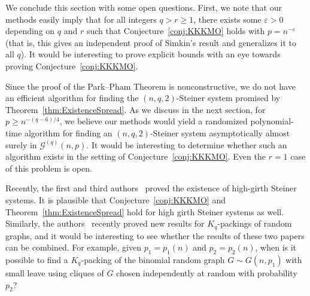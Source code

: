 \documentclass[11pt]{article}
\numberwithin{equation}{section}
\newcounter{i}
\theoremstyle{plain}
\theoremstyle{plain} %
\theoremstyle{definition}
\newcommand{\cG}{\mathcal{G}}
\begin{document}

We conclude this section with some open questions.  First, we note that our methods easily imply that for all integers $q > r\ge 1$, there exists some $\varepsilon > 0$ depending on $q$ and $r$ such that Conjecture~\ref{conj:KKKMO} holds with $p=n^{-\varepsilon}$ (that is, this gives an independent proof of Simkin's result and generalizes it to all $q$). It would be interesting to prove explicit bounds with an eye towards proving Conjecture~\ref{conj:KKKMO}.

Since the proof of the Park--Pham Theorem is nonconstructive, we do not have an efficient algorithm for finding the $(n, q, 2)$-Steiner system promised by Theorem~\ref{thm:ExistenceSpread}. As we discuss in the next section, for $p \geq n^{-(q - 6)/4}$, we believe our methods would yield a randomized polynomial-time algorithm for finding an $(n,q,2)$-Steiner system asymptotically almost surely in $\cG^{(q)}(n,p)$. It would be interesting to determine whether such an algorithm exists in the setting of Conjecture~\ref{conj:KKKMO}.  Even the $r = 1$ case of this problem is open.

Recently, the first and third authors~\cite{DPII} proved the existence of high-girth Steiner systems.  It is plausible that Conjecture~\ref{conj:KKKMO} and Theorem~\ref{thm:ExistenceSpread} hold for high girth Steiner systems as well.  Similarly, the authors~\cite{DKPIII} recently proved new results for $K_q$-packings of random graphs, and it would be interesting to see whether the results of these two papers can be combined.  For example, given $p_1 = p_1(n)$ and $p_2 = p_2(n)$, when is it possible to find a $K_q$-packing of the binomial random graph $G\sim G(n,p_1)$ with small leave using cliques of $G$ chosen independently at random with probability $p_2$?  
\end{document}
